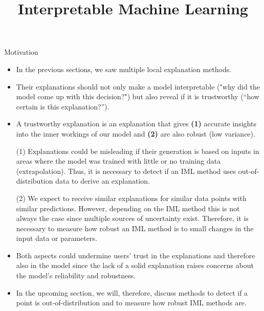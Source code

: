 \documentclass[11pt,compress,t,notes=noshow, aspectratio=169, xcolor=table]{beamer}
\title{Interpretable Machine Learning}
\date{}
\begin{document}
	




\newcommand{\titlefigure}{figure/dbscan.jpg}
\newcommand{\learninggoals}{
\item Understand the aspects that undermine users' trust in an explanation
\item Learn diagnostic tools that could increase trust }



\begin{vbframe}{Motivation}
	\begin{itemize}
		\item In the previous sections, we saw multiple local explanation methods. 
		\item Their explanations should not only make a model interpretable ("why did the model come up with this decision?") but also reveal if it is trustworthy (``how certain is this explanation?'').
		\item A trustworthy explanation is an explanation that gives \textbf{(1)} accurate insights into the inner workings of our model and \textbf{(2)} are also robust (low variance). 
		\item[(1)] Explanations could be misleading if their generation is based on inputs in areas where the model was trained with little or no training data (extrapolation). Thus, it is necessary to detect if an IML method uses out-of-distribution data to derive an explanation. 
		\item[(2)] We expect to receive similar explanations for similar data points with similar predictions. However, depending on the IML method this is not always the case since multiple sources of uncertainty exist. Therefore, it is necessary to measure how robust an IML method is to small changes in the input data or parameters. 
		\item Both aspects could undermine users' trust in the explanations and therefore also in the model since the lack of a solid explanation raises concerns about the model's reliability and robustness. 
		\item In the upcoming section, we will, therefore, discuss methods to detect if a point is out-of-distribution and to measure how robust IML methods are.
	\end{itemize}
\end{vbframe}
\end{document}
